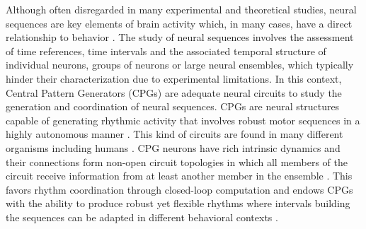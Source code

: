Although often disregarded in many experimental and theoretical studies, neural sequences are key elements of brain activity which, in many cases, have a direct relationship to behavior \cite{hahnloser_ultra-sparse_2002,venaille_synchronization_2005,hb10,buzsaki_space_2018,rabinovich_discrete_2018,paton_neural_2018,elices_robust_2019}.
The study of neural sequences involves the assessment of time references, time intervals and the associated temporal structure of individual neurons, groups of neurons or large neural ensembles, which typically hinder their characterization due to experimental limitations. In this context, Central Pattern Generators (CPGs) are adequate neural circuits to study the generation and coordination of neural sequences. 
CPGs are neural structures capable of generating rhythmic activity that involves robust motor sequences in a highly autonomous manner \cite{hartline_mottor_1976,selverston_reliable_2000,marder_central_2001}. This kind of circuits are found in many different organisms including humans \cite{dimitrijevic_evidence_1998,pavlidis_neonatal_2016, arichi_localization_2017}. CPG neurons have rich intrinsic dynamics and their connections form non-open circuit topologies in which all members of the circuit receive information from at least another member in the ensemble \cite{selverston_reliable_2000,huerta_topology_2001}. This favors rhythm coordination through closed-loop computation and endows CPGs with the ability to produce robust yet flexible rhythms where intervals building the sequences can be adapted in different behavioral contexts \cite{elices_robust_2019}. %

